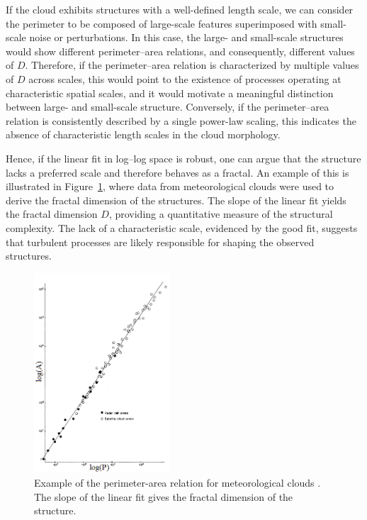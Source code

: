 If the cloud exhibits structures with a well-defined length scale, we can consider the perimeter to be composed of large-scale features superimposed with small-scale noise or perturbations. In this case, the large- and small-scale structures would show different perimeter–area relations, and consequently, different values of $D$. Therefore, if the perimeter–area relation is characterized by multiple values of $D$ across scales, this would point to the existence of processes operating at characteristic spatial scales, and it would motivate a meaningful distinction between large- and small-scale structure. Conversely, if the perimeter–area relation is consistently described by a single power-law scaling, this indicates the absence of characteristic length scales in the cloud morphology.

Hence, if the linear fit in log–log space is robust, one can argue that the structure lacks a preferred scale and therefore behaves as a fractal. An example of this is illustrated in Figure~\ref{fig:perimeter_area_example}, where data from meteorological clouds were used to derive the fractal dimension of the structures. The slope of the linear fit yields the fractal dimension $D$, providing a quantitative measure of the structural complexity. The lack of a characteristic scale, evidenced by the good fit, suggests that turbulent processes are likely responsible for shaping the observed structures.

\begin{figure}[t]
    \centering
    \includegraphics[width=0.45\textwidth]{figures/lovejoy.png}
    \caption{Example of the perimeter-area relation for meteorological clouds \cite{lovejoy1982area}. The slope of the linear fit gives the fractal dimension of the structure.}
    \label{fig:perimeter_area_example}
\end{figure}

